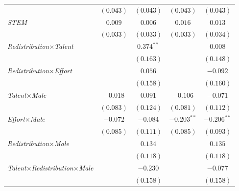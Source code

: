 \begin{table}[htpb]
\begin{center}
\begin{footnotesize}
\begin{threeparttable}
\begin{tabular}{l c c c c}
                                                                    & $(0.043)$      & $(0.043)$      & $(0.043)$     & $(0.043)$     \\
\textit{STEM}                                                       & $0.009$        & $0.006$        & $0.016$       & $0.013$       \\
                                                                    & $(0.033)$      & $(0.033)$      & $(0.033)$     & $(0.034)$     \\
\textit{Redistribution}$\times$\textit{Talent}                      &                & $0.374^{**}$   &               & $0.008$       \\
                                                                    &                & $(0.163)$      &               & $(0.148)$     \\
\textit{Redistribution}$\times$\textit{Effort}                      &                & $0.056$        &               & $-0.092$      \\
                                                                    &                & $(0.158)$      &               & $(0.160)$     \\
\textit{Talent}$\times$\textit{Male}                                & $-0.018$       & $0.091$        & $-0.106$      & $-0.071$      \\
                                                                    & $(0.083)$      & $(0.124)$      & $(0.081)$     & $(0.112)$     \\
\textit{Effort}$\times$\textit{Male}                                & $-0.072$       & $-0.084$       & $-0.203^{**}$ & $-0.206^{**}$ \\
                                                                    & $(0.085)$      & $(0.111)$      & $(0.085)$     & $(0.093)$     \\
\textit{Redistribution}$\times$\textit{Male}                        &                & $0.134$        &               & $0.135$       \\
                                                                    &                & $(0.118)$      &               & $(0.118)$     \\
\textit{Talent}$\times$\textit{Redistribution}$\times$\textit{Male} &                & $-0.230$       &               & $-0.077$      \\
                                                                    &                & $(0.158)$      &               & $(0.158)$     \\

\end{tabular}
\end{threeparttable}
\end{footnotesize}
\end{center}
\end{table}
